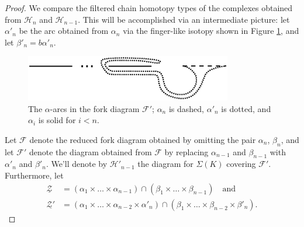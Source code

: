 \documentclass[11pt]{article}
\theoremstyle{plain} \newtheorem{thm}{Theorem}[subsection]
\theoremstyle{plain} \newtheorem{cor}[thm]{Corollary}
\theoremstyle{plain} \newtheorem{prop}[thm]{Proposition}
\theoremstyle{plain} \newtheorem{conj}[thm]{Conjecture}
\theoremstyle{plain} \newtheorem{lem}[thm]{Lemma}
\theoremstyle{definition} \newtheorem{df}[thm]{Definition}
\theoremstyle{remark} \newtheorem{rmk}[thm]{Remark}
\theoremstyle{remark} \newtheorem{obs}[thm]{Observation}
\newcommand{\DBC}[1]{\Sigma(#1)}
\newcommand{\Zcal}{\mathcal{Z}}
\newcommand{\h}{\mathcal{H}}
\newcommand{\red}[1]{\underline{#1}}
\numberwithin{equation}{section}
\begin{document}
\begin{proof}
We compare the filtered chain homotopy types of the complexes obtained from $\h_{n}$ and $\h_{n-1}$.  This will be accomplished via an intermediate picture: let $\alpha'_{n}$ be the arc obtained from $\alpha_{n}$ via the finger-like isotopy shown in Figure \ref{fig:redalpha}, and let $\beta'_{n} = b\alpha'_{n}$.

\begin{figure}[h!]
\centering
\begin{minipage}[c]{.55 \linewidth}
\includegraphics[height = 20mm]{Redalpha}
\end{minipage}
\begin{minipage}[c]{.35\linewidth}
\caption[Finger-like isotopy for comparing arc omission choices]{The $\alpha$-arcs in the fork diagram $\mathcal{F}'$; $\alpha_{n}$ is dashed, $\alpha'_{n}$ is dotted, and $\alpha_{i}$ is solid for $i < n$.\label{fig:redalpha}}
\end{minipage}
\end{figure}

Let $\mathcal{F}$ denote the reduced fork diagram obtained by omitting the pair $\alpha_{n}$, $\beta_{n}$, and let $\mathcal{F}'$ denote the diagram obtained from $\mathcal{F}$ by replacing $\alpha_{n-1}$ and $\beta_{n-1}$ with $\alpha'_{n}$ and $\beta'_{n}$.  We'll denote by $\h'_{n-1}$ the diagram for $\DBC{K}$ covering $\mathcal{F}'$.  Furthermore, let
\begin{align*}
\red{\Zcal} &= \left( \alpha_{1} \times \ldots \times \alpha_{n-1} \right) \cap \left( \beta_{1} \times \ldots \times \beta_{n-1} \right) \quad \text{and} \quad\\
\red{\Zcal'} &= \left( \alpha_{1} \times \ldots \times \alpha_{n-2} \times \alpha'_{n} \right) \cap \left( \beta_{1} \times \ldots \times \beta_{n-2} \times \beta'_{n} \right).
\end{align*}


\end{proof}
\end{document}
